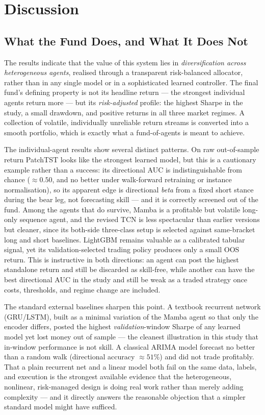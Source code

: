 \chapter{Discussion}
\label{08_Discussion}

\section{What the Fund Does, and What It Does Not}
\label{sec:agent_contributions}

The results indicate that the value of this system lies in \textit{diversification across heterogeneous agents}, realised through a transparent risk-balanced allocator, rather than in any single model or in a sophisticated learned controller. The final fund's defining property is not its headline return --- the strongest individual agents return more --- but its \textit{risk-adjusted} profile: the highest Sharpe in the study, a small drawdown, and positive returns in all three market regimes. A collection of volatile, individually unreliable return streams is converted into a smooth portfolio, which is exactly what a fund-of-agents is meant to achieve.


The individual-agent results show several distinct patterns. On raw out-of-sample return PatchTST looks like the strongest learned model, but this is a cautionary example rather than a success: its directional AUC is indistinguishable from chance ($\approx 0.50$, and no better under walk-forward retraining or instance normalisation), so its apparent edge is directional \textit{beta} from a fixed short stance during the bear leg, not forecasting skill --- and it is correctly screened out of the fund. Among the agents that do survive, Mamba is a profitable but volatile long-only sequence agent, and the revised TCN is less spectacular than earlier versions but cleaner, since its both-side three-class setup is selected against same-bracket long and short baselines. LightGBM remains valuable as a calibrated tabular signal, yet its validation-selected trading policy produces only a small OOS return. This is instructive in both directions: an agent can post the highest standalone return and still be discarded as skill-free, while another can have the best directional AUC in the study and still be weak as a traded strategy once costs, thresholds, and regime change are included.


The standard external baselines sharpen this point. A textbook recurrent network (GRU/LSTM), built as a minimal variation of the Mamba agent so that only the encoder differs, posted the highest \textit{validation}-window Sharpe of any learned model yet lost money out of sample --- the cleanest illustration in this study that in-window performance is not skill. A classical ARIMA model forecast no better than a random walk (directional accuracy $\approx 51\%$) and did not trade profitably. That a plain recurrent net and a linear model both fail on the same data, labels, and execution is the strongest available evidence that the heterogeneous, nonlinear, risk-managed design is doing real work rather than merely adding complexity --- and it directly answers the reasonable objection that a simpler standard model might have sufficed.

